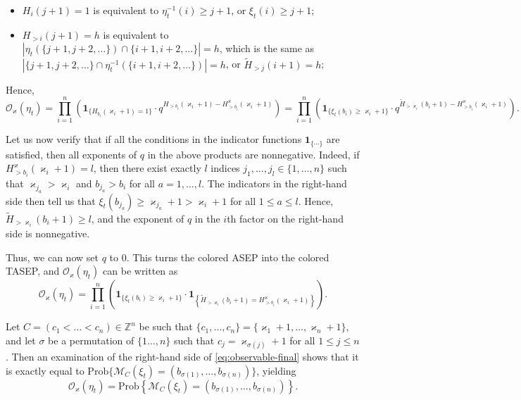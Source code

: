 \documentclass[11pt,reqno]{amsart}
\theoremstyle{definition}
\theoremstyle{remark}
\theoremstyle{remark}
\def\leq{\leqslant}
\def\geq{\geqslant}
\renewcommand\le{\leq}
\renewcommand\ge{\geq}
\def\O{\mathcal{O}}
\def\Z{\mathbb Z}
\def\M{\mathcal M}
\numberwithin{equation}{section}
\begin{document}
	\begin{itemize}
		\item $H_i(j+1)=1$ is equivalent to $\eta_t^{-1}(i)\ge j+1$, or $\xi_t(i)\ge j+1$;   
		\item $H_{>i}(j+1)=h$ is equivalent to $|\eta_t(\{j+1,j+2,\dots\})\cap \{i+1,i+2,\dots\}|=h$, which is the same as 
		$|\{j+1,j+2,\dots\}\cap \eta^{-1}_t(\{i+1,i+2,\dots\})|=h$, or $\widetilde H_{>j}(i+1)=h$;
		
	\end{itemize}
	
	Hence,
	$$
	\O_\varkappa(\eta_t)=\prod_{i=1}^n \left(\mathbf{1}_{\{H_{b_i}(\varkappa_i+1)=1\}} \cdot q^{H_{>b_i}(\varkappa_i+1)-H^\varkappa_{>b_i}(\varkappa_i+1)}\right)=
	\prod_{i=1}^n \left(\mathbf{1}_{\{\xi_t(b_i)\ge \varkappa_i+1\}} \cdot q^{\widetilde H_{>\varkappa_i}(b_i+1)-H^\varkappa_{>b_i}(\varkappa_i+1)}\right).
	$$
	
	Let us now verify that if all the conditions in the indicator functions $\mathbf{1}_{\{\cdots\}}$ are satisfied, then all  exponents of $q$ in the above products are nonnegative. Indeed, if $H_{>b_i}^\varkappa(\varkappa_i+1)=l$, then there exist exactly $l$ indices $j_1,\dots,j_l\in\{1,\dots,n\}$ such that $\varkappa_{j_a}>\varkappa_i$ and $b_{j_a}>b_i$ for all $a=1,\dots,l$. The indicators in the right-hand side then tell us that $\xi_t(b_{j_a})\ge \varkappa_{j_a}+1>\varkappa_i+1$ for all $1\le a\le l$. Hence, $\widetilde H_{>\varkappa_i}(b_i+1)\ge l$, and the exponent of $q$ in the $i$th factor on the right-hand side is nonnegative. 
	
	Thus, we can now set $q$ to 0. This turns the colored ASEP into the colored TASEP, and $\O_\varkappa(\eta_t)$ can be written as
	\begin{equation}
		\label{eq:observable-final}
		\O_\varkappa(\eta_t)=\prod_{i=1}^n \left(\mathbf{1}_{\{\xi_t(b_i)\ge \varkappa_i+1\}}\cdot  \mathbf{1}_{\left\{\widetilde H_{>\varkappa_i}(b_i+1)=H^\varkappa_{>b_i}(\varkappa_i+1)\right\}}\right).
	\end{equation}     
	
	Let $C=(c_1<\dots<c_n)\in\Z^n$ be such that $\{c_1,\dots,c_n\}=\{\varkappa_1+1,\dots,\varkappa_n+1\}$, and let $\sigma$ be a permutation of $\{1\dots,n\}$ such that $c_j=\varkappa_{\sigma(j)}+1$ for all $1\le j\le n$. Then an examination of the 
	right-hand side of \eqref{eq:observable-final} shows that it is exactly equal to $\mathrm{Prob}\{\M_C(\xi_t)=(b_{\sigma(1)},\dots,b_{\sigma(n)})\}$, yielding 
	\begin{equation}
		\label{eq:equal-observables}
		\O_\varkappa(\eta_t)=\mathrm{Prob}\left\{\M_C(\xi_t)=\left(b_{\sigma(1)},\dots,b_{\sigma(n)}\right)\right\}.
	\end{equation}
	
\end{document}
